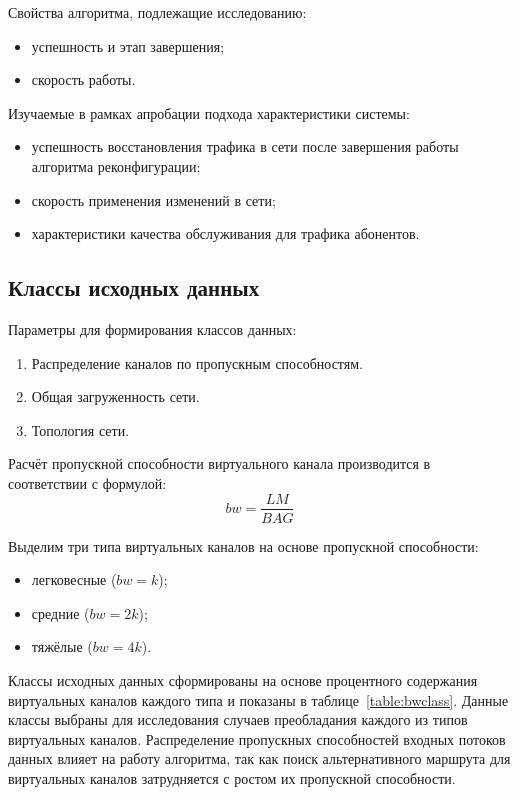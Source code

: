 \documentclass[12pt,fleqn]{article}
\begin{document}
Свойства алгоритма, подлежащие исследованию:
\begin{itemize}
	\item успешность и этап завершения;
	\item скорость работы.
\end{itemize}

Изучаемые в рамках апробации подхода характеристики системы:
\begin{itemize}
	\item успешность восстановления трафика в сети после завершения работы алгоритма реконфигурации;
	\item скорость применения изменений в сети;
	\item характеристики качества обслуживания для трафика абонентов.
\end{itemize}

\subsection{Классы исходных данных}
Параметры для формирования классов данных:
\begin{enumerate}
	\item Распределение каналов по пропускным способностям.
	\item Общая загруженность сети.
	\item Топология сети.
\end{enumerate}

Расчёт пропускной способности виртуального канала производится в соответствии с формулой:
$$bw = \frac{LM}{BAG}$$

Выделим три типа виртуальных каналов на основе пропускной способности:
\begin{itemize}
	\item легковесные ($bw=k$);
	\item средние ($bw=2k$);
	\item тяжёлые ($bw=4k$).
\end{itemize}

Классы исходных данных сформированы на основе процентного содержания виртуальных каналов каждого типа и показаны в таблице~\ref{table:bwclass}. Данные классы выбраны для исследования случаев преобладания каждого из типов виртуальных каналов. Распределение пропускных способностей входных потоков данных влияет на работу алгоритма, так как поиск альтернативного маршрута для виртуальных каналов затрудняется с ростом их пропускной способности.
\end{document}
